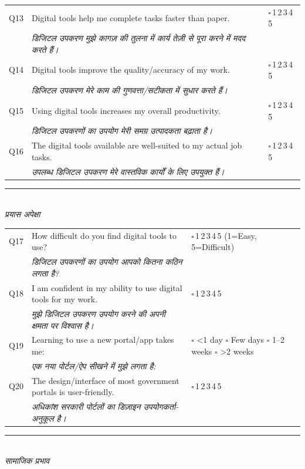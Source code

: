 \documentclass[10pt,a4paper]{article}
\newcommand{\likert}{{\Large$\square$}\,1\quad{\Large$\square$}\,2\quad{\Large$\square$}\,3\quad{\Large$\square$}\,4\quad{\Large$\square$}\,5}
\begin{document}
\noindent\begin{tabularx}{\textwidth}{@{}L{0.8cm} X L{5.2cm}@{}}
Q13 & Digital tools help me complete tasks faster than paper. & \likert \\
 & {\hindifont\small\itshape\color{black!70} डिजिटल उपकरण मुझे कागज़ की तुलना में कार्य तेज़ी से पूरा करने में मदद करते हैं।} & \\[3pt]
Q14 & Digital tools improve the quality/accuracy of my work. & \likert \\
 & {\hindifont\small\itshape\color{black!70} डिजिटल उपकरण मेरे काम की गुणवत्ता/सटीकता में सुधार करते हैं।} & \\[3pt]
Q15 & Using digital tools increases my overall productivity. & \likert \\
 & {\hindifont\small\itshape\color{black!70} डिजिटल उपकरणों का उपयोग मेरी समग्र उत्पादकता बढ़ाता है।} & \\[3pt]
Q16 & The digital tools available are well-suited to my actual job tasks. & \likert \\
 & {\hindifont\small\itshape\color{black!70} उपलब्ध डिजिटल उपकरण मेरे वास्तविक कार्यों के लिए उपयुक्त हैं।} & \\[3pt]
\end{tabularx}
\vspace{3pt}
\noindent\rule{\textwidth}{0.3pt}\vspace{3pt}
\\
{\hindifont\itshape\color{black!70} प्रयास अपेक्षा}\vspace{3pt}

\noindent\begin{tabularx}{\textwidth}{@{}L{0.8cm} X L{5.2cm}@{}}
Q17 & How difficult do you find digital tools to use? & \likert{} {\scriptsize(1=Easy, 5=Difficult)} \\
 & {\hindifont\small\itshape\color{black!70} डिजिटल उपकरणों का उपयोग आपको कितना कठिन लगता है?} & \\[3pt]
Q18 & I am confident in my ability to use digital tools for my work. & \likert \\
 & {\hindifont\small\itshape\color{black!70} मुझे डिजिटल उपकरण उपयोग करने की अपनी क्षमता पर विश्वास है।} & \\[3pt]
Q19 & Learning to use a new portal/app takes me: & {\Large$\square$} <1 day {\Large$\square$} Few days {\Large$\square$} 1--2 weeks {\Large$\square$} >2 weeks \\
 & {\hindifont\small\itshape\color{black!70} एक नया पोर्टल/ऐप सीखने में मुझे लगता है:} & \\[3pt]
Q20 & The design/interface of most government portals is user-friendly. & \likert \\
 & {\hindifont\small\itshape\color{black!70} अधिकांश सरकारी पोर्टलों का डिज़ाइन उपयोगकर्ता-अनुकूल है।} & \\[3pt]
\end{tabularx}
\vspace{3pt}
\noindent\rule{\textwidth}{0.3pt}\vspace{3pt}
\\
{\hindifont\itshape\color{black!70} सामाजिक प्रभाव}\vspace{3pt}
\end{document}

